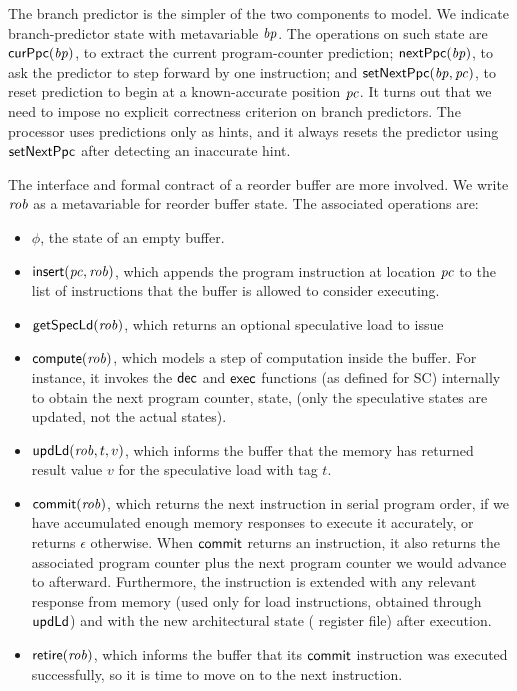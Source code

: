 The branch predictor is the simpler of the two components to model.
We indicate branch-predictor state with metavariable $\mathit{bp}$.
The operations on such state are $\mathsf{curPpc}(\mathit{bp})$, to extract the
current program-counter prediction; $\mathsf{nextPpc}(\mathit{bp})$, to ask the
predictor to step forward by one instruction; and $\mathsf{setNextPpc}(\mathit{bp}, \mathit{pc})$,
to reset prediction to begin at a known-accurate position $\mathit{pc}$.  It
turns out that we need to impose no explicit correctness criterion on
branch predictors.  The processor uses predictions only as hints, and
it always resets the predictor using $\mathsf{setNextPpc}$ after detecting an
inaccurate hint.

The interface and formal contract of a reorder buffer are more
involved.  We write $\mathit{rob}$ as a metavariable for reorder buffer
state.  The associated operations are:
\begin{itemize}
\item $\phi$, the state of an empty buffer.
\item $\mathsf{insert}(\mathit{pc}, \mathit{rob})$, which appends the program instruction at location $\mathit{pc}$ to the list of instructions that the buffer is allowed to consider executing.
\item $\mathsf{get}\mathsf{Spec}\mathsf{Ld}(\mathit{rob})$, which returns an optional speculative load to issue
\item $\mathsf{compute}(\mathit{rob})$, which models a
step of computation inside the buffer. For instance, it invokes the $\mathsf{dec}$
and $\mathsf{exec}$ functions (as defined for SC) internally to obtain the next program
counter, state, \etc{} (only the speculative states are updated, not the actual states).
\item $\mathsf{upd}\mathsf{Ld}(\mathit{rob},t,v)$, which informs the buffer that the memory
has returned result value $v$ for the speculative load with tag $t$.
\item $\mathsf{commit}(\mathit{rob})$, which returns the next instruction in serial
program order, if we have accumulated enough memory responses to execute it
accurately, or returns
$\epsilon$ otherwise.  When $\mathsf{commit}$ returns an instruction, it also
returns the associated program counter plus the next program counter
we would advance to afterward.
 Furthermore, the instruction is
extended with any relevant response from memory (used only for load
instructions, obtained through $\mathsf{upd}\mathsf{Ld}$) and with the new architectural state (\eg{} register
file) after execution.
\item $\mathsf{retire}(\mathit{rob})$, which informs the buffer that its $\mathsf{commit}$
instruction was executed successfully, so it is time to move on to the
next instruction.
\end{itemize}

